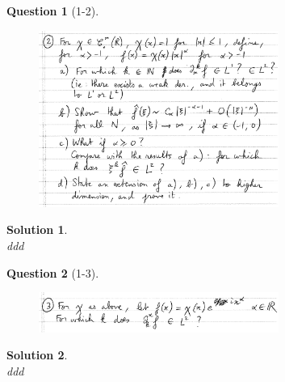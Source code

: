 \documentclass[11pt]{article}
\theoremstyle{plain}
\theoremstyle{quest}
\newtheorem*{question}{Question}
\newtheorem*{solution}{Solution}
\begin{document}
\begin{question}[1-2]
\hfill
\begin{figure}[h!]
  \centering
    \includegraphics[width=0.7\textwidth]{pde2-1-2.png}
\end{figure}
\end{question}
\begin{solution} \hfill \\
ddd
\end{solution}

\newpage

\begin{question}[1-3]
\hfill
\begin{figure}[h!]
  \centering
    \includegraphics[width=0.7\textwidth]{pde2-1-3.png}
\end{figure}
\end{question}
\begin{solution} \hfill \\
ddd
\end{solution}

\newpage
\end{document}
